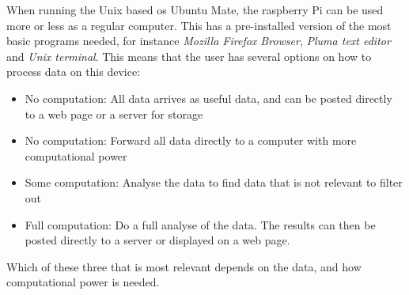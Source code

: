 When running the Unix based \gls{os} Ubuntu Mate, the raspberry Pi can be used more or less as a regular computer. This has a pre-installed version of the most basic programs needed, for instance \textit{Mozilla Firefox Browser}, \textit{Pluma text editor} and \textit{Unix terminal}. This means that the user has several options on how to process data on this device: 

\begin{itemize}
  \item No computation: All data arrives as useful data, and can be posted directly to a web page or a server for storage
  \item No computation: Forward all data directly to a computer with more computational power
  \item Some computation: Analyse the data to find data that is not relevant to filter out
  \item Full computation: Do a full analyse of the data. The results can then be posted directly to a server or displayed on a web page. 
\end{itemize}

Which of these three that is most relevant depends on the data, and how computational power is needed. 


